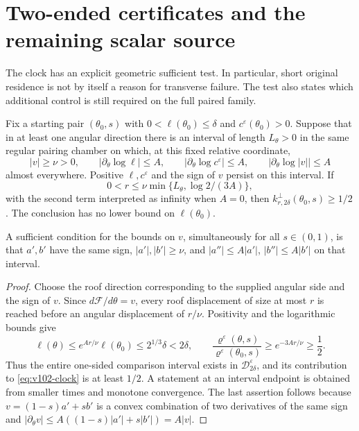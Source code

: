 \section{Two-ended certificates and the remaining scalar source}
\label{sec:v102-certificate}
The clock has an explicit geometric sufficient test. In particular,
short original residence is not by itself a reason for transverse
failure. The test also states which additional control is still
required on the full paired family.

\begin{theorem}
\label{thm:v102-certificate}
Fix a starting pair $(\theta_0,s)$ with $0<\ell(\theta_0)\le\delta$
and $c^\varepsilon(\theta_0)>0$. Suppose that in at least one angular
direction there is an interval of length $L_\theta>0$ in the same
regular pairing chamber on which, at this fixed relative coordinate,
\begin{equation}\label{eq:v102-local-certificate}
 |v|\ge\nu>0,\qquad
 |\partial_\theta\log\ell|\le A,\qquad
 |\partial_\theta\log c^\varepsilon|\le A,\qquad
 |\partial_\theta\log|v||\le A
\end{equation}
almost everywhere. Positive $\ell,c^\varepsilon$ and the sign of
$v$ persist on this interval. If
\begin{equation}\label{eq:v102-certificate-radius}
 0<r\le\nu\min\{L_\theta,\log 2/(3A)\},
\end{equation}
with the second term interpreted as infinity when $A=0$, then
$k_{r,2\delta}^\perp(\theta_0,s)\ge1/2$.
The conclusion has no lower bound on $\ell(\theta_0)$.

A sufficient condition for the bounds on $v$, simultaneously for
all $s\in(0,1)$, is that $a',b'$ have the same sign,
$|a'|,|b'|\ge\nu$, and
$|a''|\le A|a'|$, $|b''|\le A|b'|$ on that interval.
\end{theorem}
\begin{proof}
Choose the roof direction corresponding to the supplied angular
side and the sign of $v$. Since $d\mathscr F/d\theta=v$, every
roof displacement of size at most $r$ is reached before an angular
displacement of $r/\nu$. Positivity and the logarithmic bounds give
\[
 \ell(\theta)\le e^{Ar/\nu}\ell(\theta_0)
                      \le2^{1/3}\delta<2\delta,
 \qquad
 \frac{\varrho^\varepsilon(\theta,s)}
      {\varrho^\varepsilon(\theta_0,s)}
                      \ge e^{-3Ar/\nu}\ge\frac12.
\]
Thus the entire one-sided comparison interval exists in
$\mathcal D_{2\delta}^\varepsilon$, and its contribution to
\eqref{eq:v102-clock} is at least $1/2$. A statement at an interval
endpoint is obtained from smaller times and monotone convergence.
The last assertion follows because $v=(1-s)a'+sb'$ is a convex
combination of two derivatives of the same sign and
$|\partial_\theta v|\le A((1-s)|a'|+s|b'|)=A|v|$.
\end{proof}

